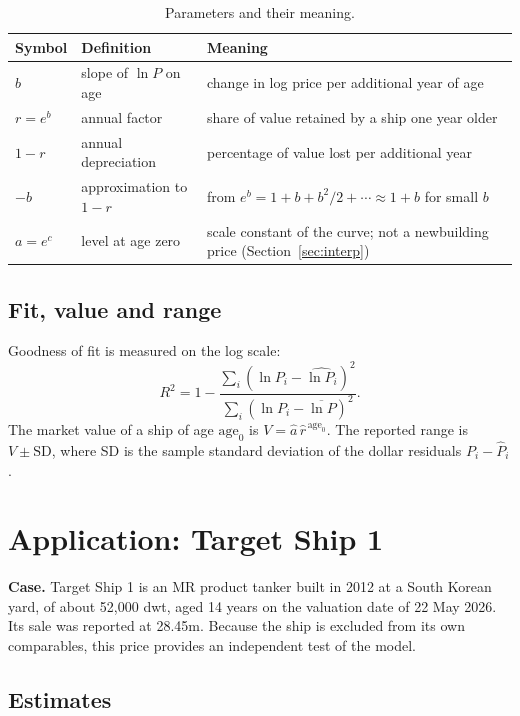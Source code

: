 \documentclass[11pt,a4paper]{article}
\newcommand{\usd}[1]{\text{US\$}#1}
\newcommand{\age}{\mathrm{age}}
\begin{document}
\begin{table}[h]
\centering
\caption{Parameters and their meaning.}
\label{tab:params}
\begin{tabularx}{\linewidth}{@{}l l X@{}}
\toprule
Symbol & Definition & Meaning \\
\midrule
$b$ & slope of $\ln P$ on age & change in log price per additional year of age \\
$r = e^{b}$ & annual factor & share of value retained by a ship one year older \\
$1 - r$ & annual depreciation & percentage of value lost per additional year \\
$-b$ & approximation to $1-r$ & from $e^{b} = 1 + b + b^2/2 + \cdots \approx 1 + b$ for small $b$ \\
$a = e^{c}$ & level at age zero & scale constant of the curve; not a newbuilding price (Section~\ref{sec:interp}) \\
\bottomrule
\end{tabularx}
\end{table}

\subsection{Fit, value and range}

Goodness of fit is measured on the log scale:
\begin{equation}
\label{eq:r2}
R^2 = 1 - \frac{\sum_i (\ln P_i - \widehat{\ln P_i})^2}{\sum_i (\ln P_i - \overline{\ln P})^2}.
\end{equation}
The market value of a ship of age $\age_0$ is $V = \hat a\,\hat r^{\,\age_0}$. The reported range is $V \pm \mathrm{SD}$, where SD is the sample standard deviation of the dollar residuals $P_i - \hat P_i$.

\section{Application: Target Ship 1}

\textbf{Case.} Target Ship 1 is an MR product tanker built in 2012 at a South Korean yard, of about 52,000 dwt, aged 14 years on the valuation date of 22 May 2026. Its sale was reported at \usd{28.45}m. Because the ship is excluded from its own comparables, this price provides an independent test of the model.

\subsection{Estimates}
\end{document}
